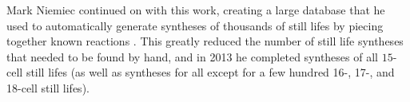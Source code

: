 Mark Niemiec continued on with this work, creating a large database that he used to automatically generate syntheses of thousands of still lifes by piecing together known reactions \cite{Nie03,Nie10}. This greatly reduced the number of still life syntheses that needed to be found by hand, and in 2013 he completed syntheses of all $15$-cell still lifes (as well as syntheses for all except for a few hundred 16-, 17-, and 18-cell still lifes).

\begin{figure}[!htb]
	\centering
	 \\[1em]
	
	 \\[1em]
	
	 \\[1em]
	
	 \\[1em]
	
	 \\[1em]
	

\end{figure}
